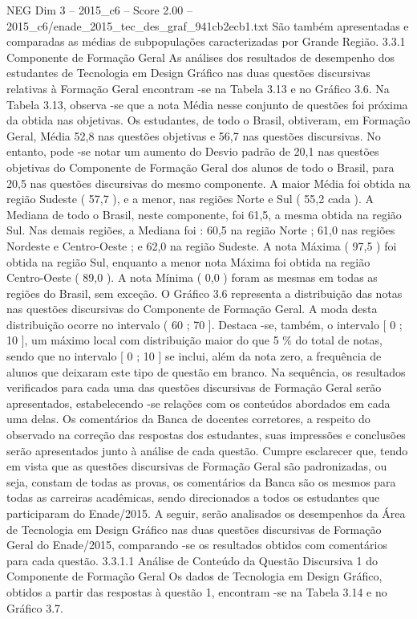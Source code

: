 \begin{textsample}{NEG Dim 3 – 2015\_c6 – Score 2.00 – 2015\_c6/enade\_2015\_tec\_des\_graf\_941cb2ecb1.txt}
São também apresentadas e comparadas as médias de subpopulações caracterizadas por Grande Região. 3.3.1 Componente de Formação Geral As análises dos resultados de desempenho dos estudantes de Tecnologia em Design Gráfico nas duas questões discursivas relativas à Formação Geral encontram -se na Tabela 3.13 e no Gráfico 3.6.
Na Tabela 3.13, observa -se que a nota Média nesse conjunto de questões foi próxima da obtida nas objetivas.
Os estudantes, de todo o Brasil, obtiveram, em Formação Geral, Média 52,8 nas questões objetivas e 56,7 nas questões discursivas.
No entanto, pode -se notar um aumento do Desvio padrão de 20,1 nas questões objetivas do Componente de Formação Geral dos alunos de todo o Brasil, para 20,5 nas questões discursivas do mesmo componente.
A maior Média foi obtida na região Sudeste ( 57,7 ), e a menor, nas regiões Norte e Sul ( 55,2 cada ).
A Mediana de todo o Brasil, neste componente, foi 61,5, a mesma obtida na região Sul.
Nas demais regiões, a Mediana foi : 60,5 na região Norte ; 61,0 nas regiões Nordeste e Centro-Oeste ; e 62,0 na região Sudeste.
A nota Máxima ( 97,5 ) foi obtida na região Sul, enquanto a menor nota Máxima foi obtida na região Centro-Oeste ( 89,0 ).
A nota Mínima ( 0,0 ) foram as mesmas em todas as regiões do Brasil, sem exceção.
O Gráfico 3.6 representa a distribuição das notas nas questões discursivas do Componente de Formação Geral.
A moda desta distribuição ocorre no intervalo ( 60 ; 70 ].
Destaca -se, também, o intervalo [ 0 ; 10 ], um máximo local com distribuição maior do que 5 \% do total de notas, sendo que no intervalo [ 0 ; 10 ] se inclui, além da nota zero, a frequência de alunos que deixaram este tipo de questão em branco.
Na sequência, os resultados verificados para cada uma das questões discursivas de Formação Geral serão apresentados, estabelecendo -se relações com os conteúdos abordados em cada uma delas.
Os comentários da Banca de docentes corretores, a respeito do observado na correção das respostas dos estudantes, suas impressões e conclusões serão apresentados junto à análise de cada questão.
Cumpre esclarecer que, tendo em vista que as questões discursivas de Formação Geral são padronizadas, ou seja, constam de todas as provas, os comentários da Banca são os mesmos para todas as carreiras acadêmicas, sendo direcionados a todos os estudantes que participaram do Enade/2015.
A seguir, serão analisados os desempenhos da Área de Tecnologia em Design Gráfico nas duas questões discursivas de Formação Geral do Enade/2015, comparando -se os resultados obtidos com comentários para cada questão. 3.3.1.1 Análise de Conteúdo da Questão Discursiva 1 do Componente de Formação Geral Os dados de Tecnologia em Design Gráfico, obtidos a partir das respostas à questão 1, encontram -se na Tabela 3.14 e no Gráfico 3.7.

\end{textsample}
